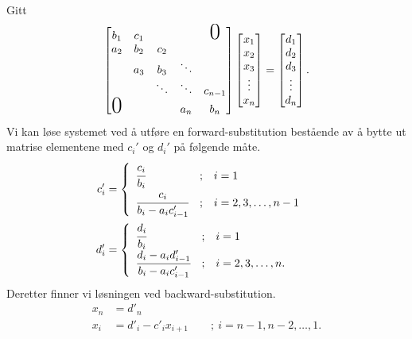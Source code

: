 \documentclass[11pt]{article}
\begin{document}
Gitt 
\begin{align*}
  \begin{bmatrix}
   {b_1} & {c_1} &  &  & \text{\huge0} \\
   {a_2} & {b_2} & {c_2} &  &  \\
    & {a_3} & {b_3} & \ddots &  \\
    &  & \ddots & \ddots & {c_{n-1}}\\
     \text{\huge0}&  &  & {a_n} & {b_n}\\
\end{bmatrix}
\begin{bmatrix}
   {x_1 }  \\
   {x_2 }  \\
   {x_3 }  \\
   \vdots   \\
   {x_n }  \\
\end{bmatrix}
=
\begin{bmatrix}
   {d_1 }  \\
   {d_2 }  \\
   {d_3 }  \\
   \vdots   \\
   {d_n }  \\
\end{bmatrix}.
\end{align*}
Vi kan løse systemet ved å utføre en forward-substitution bestående av
å bytte ut matrise elementene med $c_i'$ og $d_i'$ på følgende måte.
\begin{align*}
  c_i' &= \begin{cases}
\begin{array}{lcl}
  \cfrac{c_i}{b_i}                  & ; & i = 1 \\
  \cfrac{c_i}{b_i - a_i c'_{i - 1}} & ; & i = 2, 3, \dots, n-1 \\
\end{array}
\end{cases}\\
d_i' &= \begin{cases}
\begin{array}{lcl}
  \cfrac{d_i}{b_i}                  & ; & i = 1 \\
  \cfrac{d_i - a_i d'_{i - 1}}{b_i - a_i c'_{i - 1}} & ; & i = 2, 3, \dots, n. \\
\end{array}
\end{cases}
\end{align*}
Deretter finner vi løsningen ved backward-substitution.
\begin{align*}
  x_n &= d'_n\\
  x_i &= d'_i - c'_i x_{i + 1} \qquad ; \ i = n - 1, n - 2, \ldots, 1.
\end{align*}
\end{document}
